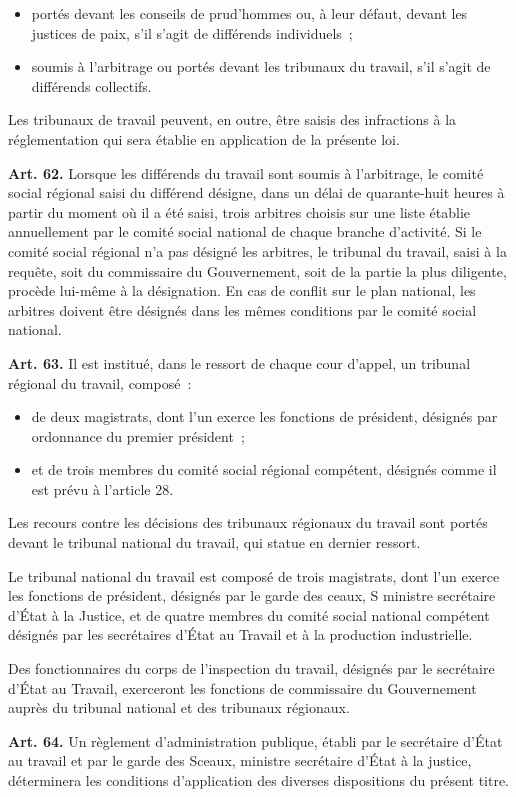 \documentclass[french,twoside]{book} %
\newcommand{\labelchar}[1]{\textbf{\color{rubric} #1}}
\def\mednobreak{\ifdim\lastskip<\medskipamount
  \removelastskip\nopagebreak\medskip\fi}
\newcommand{\labelblock}[1]{\medbreak{\noindent\color{rubric}\bfseries #1}\par\mednobreak}
\begin{document}
\begin{itemize}[itemsep=0pt,]
\item portés devant les conseils de prud’hommes ou, à leur défaut, devant les justices de paix, s’il s’agit de différends individuels ;
\item soumis à l’arbitrage ou portés devant les tribunaux du travail, s’il s’agit de différends collectifs.
\end{itemize}
\noindent Les tribunaux de travail peuvent, en outre, être saisis des infractions à la réglementation qui sera établie en application de la présente loi.\par

\labelblock{L’arbitrage}

\noindent \labelchar{Art. 62.} Lorsque les différends du travail sont soumis à l’arbitrage, le comité social régional saisi du différend désigne, dans un délai de quarante-huit heures à partir du moment où il a été saisi, trois arbitres choisis sur une liste établie annuellement par le comité social national de chaque branche d’activité. Si le comité social régional n’a pas désigné les arbitres, le tribunal du travail, saisi à la requête, soit du commissaire du Gouvernement, soit de la partie la plus diligente, procède lui-même à la désignation. En cas de conflit sur le plan national, les arbitres doivent être désignés dans les mêmes conditions par le comité social national.\par

\labelblock{Les tribunaux du travail}

\noindent \labelchar{Art. 63.} Il est institué, dans le ressort de chaque cour d’appel, un tribunal régional du travail, composé :\par

\begin{itemize}[itemsep=0pt,]
\item de deux magistrats, dont l’un exerce les fonctions de président, désignés par ordonnance du premier président ;
\item et de trois membres du comité social régional compétent, désignés comme il est prévu à l’article 28.
\end{itemize}
\noindent Les recours contre les décisions des tribunaux régionaux du travail sont portés devant le tribunal national du travail, qui statue en dernier ressort.\par
Le tribunal national du travail est composé de trois magistrats, dont l’un exerce les fonctions de président, désignés par le garde des ceaux, S ministre secrétaire d’État à la Justice, et de quatre membres du comité social national compétent désignés par les secrétaires d’État au Travail et à la production industrielle.\par
Des fonctionnaires du corps de l’inspection du travail, désignés par le secrétaire d’État au Travail, exerceront les fonctions de commissaire du Gouvernement auprès du tribunal national et des tribunaux régionaux.\par
\bigbreak
\noindent \labelchar{Art. 64.} Un règlement d’administration publique, établi par le secrétaire d’État au travail et par le garde des Sceaux, ministre secrétaire d’État à la justice, déterminera les conditions d’application des diverses dispositions du présent titre.
\renewcommand{\leftmark}{Titre VI}
\end{document}

